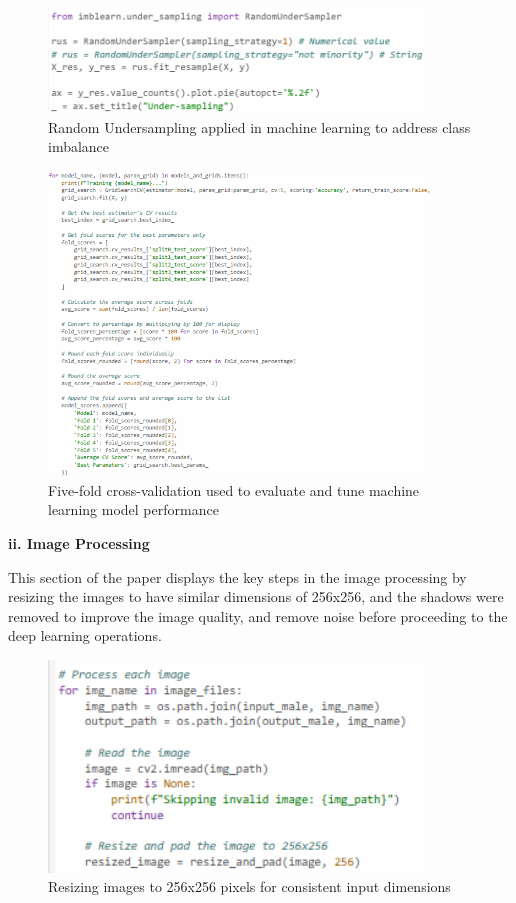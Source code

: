 \begin{figure}[!htbp]
	\centering
	\includegraphics[width=0.9\textwidth, angle=0]{figures/random_undersampling_ML.png}
	\caption{Random Undersampling applied in machine learning to address class imbalance}
\end{figure}

\begin{figure}[!htbp]
	\centering
	\includegraphics[width=0.9\textwidth, angle=0]{figures/ml_five fold_cv.png}
	\caption{Five-fold cross-validation used to evaluate and tune machine learning model performance}
\end{figure}

\newpage
\noindent\textbf{ii. Image Processing}
\vspace{-0.5cm}

This section of the paper displays the key steps in the image processing by resizing the images to have similar dimensions of 256x256, and the shadows were removed to improve the image quality, and remove noise before proceeding to the deep learning operations.
 
\begin{figure}[!htbp]
	\centering
	\includegraphics[width=0.9\textwidth, angle=0]{figures/same_dimensions.png}
	\caption{Resizing images to 256x256 pixels for consistent input dimensions}
\end{figure}

